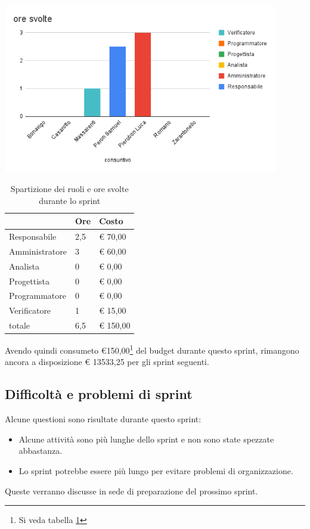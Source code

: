 \begin{center}
\includegraphics[width=12cm]{img/ore-usate.png}
\end{center}

\begin{table}[ht]
    \begin{tabularx}{\linewidth}{X|l|l}
    \rowcolor{gray!30}& Ore & Costo \\
    \hline
    
    Responsabile & 2,5 & € 70,00 \\
    \rowcolor{gray!10}Amministratore & 3 & € 60,00 \\
    Analista & 0 & € 0,00 \\
    \rowcolor{gray!10}Progettista & 0 & € 0,00 \\
    Programmatore & 0 & € 0,00 \\
    \rowcolor{gray!10}Verificatore & 1 &€ 15,00 \\
    totale & 6,5 & € 150,00 \\
    \end{tabularx}
    \caption{\label{costi-ruolo}Spartizione dei ruoli e ore svolte durante lo sprint}
\end{table}


Avendo quindi consumeto €150,00\footnote{Si veda tabella \ref{costi-ruolo}} del budget durante questo sprint, rimangono ancora a disposizione € 13533,25 per gli sprint seguenti.

\subsection{Difficoltà e problemi di sprint}

Alcune questioni sono risultate durante questo sprint:

\begin{itemize}
    \item Alcune attività sono più lunghe dello sprint e non sono state spezzate abbastanza.
    \item Lo sprint potrebbe essere più lungo per evitare problemi di organizzazione. 
\end{itemize}

Queste verranno discusse in sede di preparazione del prossimo sprint.
